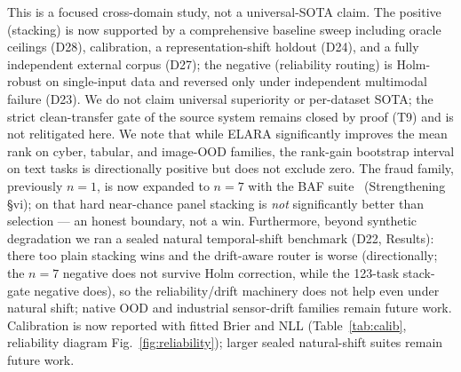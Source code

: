 \documentclass[10pt,conference]{IEEEtran}
\newcommand{\systemu}{ELARA}
\begin{document}
This is a focused cross-domain study, not a universal-SOTA claim. The positive
(stacking) is now supported by a comprehensive baseline sweep including oracle
ceilings (D28), calibration, a representation-shift holdout (D24), and a fully
independent external corpus (D27); the negative (reliability routing) is Holm-robust
on single-input data and reversed only under independent multimodal failure (D23).
We do not claim universal superiority or per-dataset SOTA; the strict clean-transfer
gate of the source system remains closed by proof (T9) and is not relitigated here. We note that while \systemu{} significantly improves the mean rank on cyber, tabular, and image-OOD families, the rank-gain bootstrap interval on text tasks is directionally positive but does not exclude zero. The fraud family, previously $n=1$, is now expanded to $n=7$ with the BAF suite~\cite{baf} (Strengthening \S vi); on that hard near-chance panel stacking is \emph{not} significantly better than selection --- an honest boundary, not a win. Furthermore, beyond synthetic degradation we ran a sealed natural temporal-shift benchmark (D22, Results): there too plain stacking wins and the drift-aware router is worse (directionally; the $n{=}7$ negative does not survive Holm correction, while the 123-task stack-gate negative does), so the reliability/drift machinery does not help even under natural shift; native OOD and industrial sensor-drift families remain future work. Calibration is now reported with fitted Brier and NLL (Table~\ref{tab:calib}, reliability diagram Fig.~\ref{fig:reliability}); larger sealed natural-shift suites remain future work.
\end{document}
